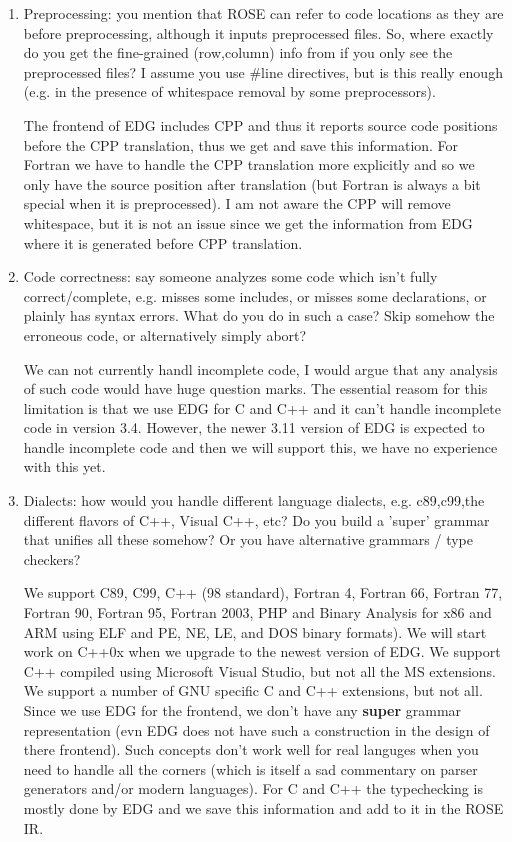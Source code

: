 \begin{enumerate}
\item Preprocessing: you mention that ROSE can refer to code locations as they are before
    preprocessing, although it inputs preprocessed files. So, where exactly do you get the
    fine-grained (row,column) info from if you only see the preprocessed files? I assume
    you use \#line directives, but is this really enough (e.g. in the presence of
    whitespace removal by some preprocessors).

    The frontend of EDG includes CPP and thus it reports source code positions
    before the CPP translation, thus we get and save this information.  For Fortran
    we have to handle the CPP translation more explicitly and so we only have the
    source position after translation (but Fortran is always a bit special when it
    is preprocessed).  I am not aware the CPP will remove whitespace, but it is not
    an issue since we get the information from EDG where it is generated before CPP
    translation.

\item Code correctness: say someone analyzes some code which isn't fully correct/complete,
    e.g. misses some includes, or misses some declarations, or plainly has syntax
    errors. What do you do in such a case? Skip somehow the erroneous code, or
    alternatively simply abort?

    We can not currently handl incomplete code, I would argue that any analysis of such
    code would have huge question marks. The essential reasom for this limitation is that 
    we use EDG for C and C++ and it can't handle incomplete code in version 3.4. 
    However, the newer 3.11 version of EDG is expected to handle incomplete code and then
    we will support this, we have no experience with this yet.

\item Dialects: how would you handle different language dialects, e.g. c89,c99,the
    different flavors of C++, Visual C++, etc? Do you build a 'super' grammar that unifies
    all these somehow? Or you have alternative grammars / type checkers?

    We support C89, C99, C++ (98 standard), Fortran 4, Fortran 66, Fortran 77, Fortran 90,
    Fortran 95, Fortran 2003, PHP and Binary Analysis for x86 and ARM using ELF and PE,
    NE, LE, and DOS binary formats).  We will start work on C++0x when we upgrade to the newest
    version of EDG.  We support C++ compiled using Microsoft Visual Studio, but not all
    the MS extensions.  We support a number of GNU specific C and C++ extensions, but not
    all. Since we use EDG for the frontend, we don't have any {\bf super} grammar
    representation (evn EDG does not have such a construction in the design of there
    frontend).  Such concepts don't work well for real languges when you need to handle
    all the corners (which is itself a sad commentary on parser generators and/or modern 
    languages).  For C and C++ the typechecking is mostly done by EDG and we save this
    information and add to it in the ROSE IR.


\end{enumerate}

